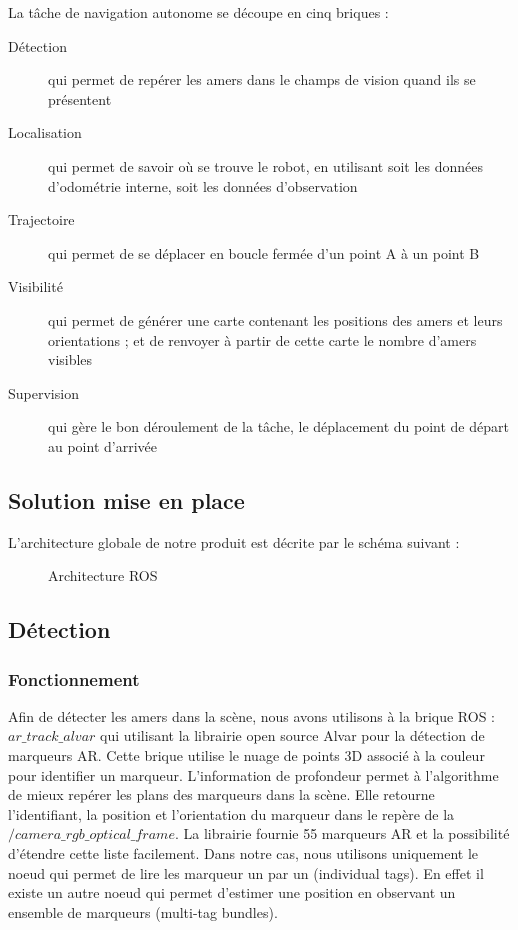 \documentclass[10pt,a4paper]{article}
\begin{document}
La tâche de navigation autonome se découpe en cinq briques : 
\begin{description}
\item [Détection] qui permet de repérer les amers dans le champs de vision quand ils se présentent 
\item [Localisation] qui permet de savoir où se trouve le robot, en utilisant soit les données d'odométrie interne, soit les données d’observation
\item [Trajectoire] qui permet de se déplacer en boucle fermée d'un point A à un point B
\item [Visibilité] qui permet de générer une carte contenant les positions des amers et leurs orientations ; et de renvoyer à partir de cette carte le nombre d'amers visibles
\item [Supervision] qui gère le bon déroulement de la tâche, le déplacement du point de départ au point d'arrivée
\end{description}



\subsection{Solution mise en place}
\label{sec:solution_mise_en_place}

L'architecture globale de notre produit est décrite par le schéma suivant :

\begin{figure}[h]
\center
\caption{Architecture ROS}	
\end{figure}




\subsection{Détection}
\label{sec:detection}

\subsubsection*{Fonctionnement}
Afin de détecter les amers dans la scène, nous avons utilisons à la brique ROS : $ar\_track\_alvar$ qui utilisant la librairie open source Alvar pour la détection de marqueurs AR.
Cette brique utilise le nuage de points 3D associé à la couleur pour identifier un marqueur. L'information de profondeur permet à l'algorithme de mieux repérer les plans des marqueurs dans la scène. Elle retourne l'identifiant, la position et l'orientation du marqueur dans le repère de la $/camera\_rgb\_optical\_frame$. La librairie fournie 55 marqueurs AR et la possibilité d'étendre cette liste facilement. Dans notre cas, nous utilisons uniquement le noeud qui permet de lire les marqueur un par un (individual tags). En effet il existe un autre noeud qui permet d'estimer une position en observant un ensemble de marqueurs (multi-tag bundles).
\end{document}
